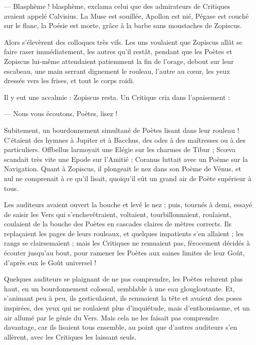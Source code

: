 \documentclass[a4paper, 11pt, oneside, polutonikogreek, french]{article}
\begin{document}
--- Blasphème ! blasphème, exclama celui que des admirateurs de Critiques avaient appelé Calvisius. La Muse est souillée, Apollon est nié, Pégase est couché sur le flanc, la Poésie est morte, grâce à la barbe sans moustaches de Zopiscus.

Alors s'élevèrent des colloques très vifs. Les uns voulaient que Zopiscus allât se faire raser immédiatement, les autres qu'il restât, pendant que les Poètes et Zopiscus lui-même attendaient patiemment la fin de l'orage, debout sur leur escabeau, une main serrant dignement le rouleau, l'autre au cœur, les yeux dressés vers les frises, et tout le corps roidi.

Il y eut une accalmie : Zopiscus resta. Un Critique cria dans l'apaisement :

--- Nous vous écoutons, Poètes, lisez !

Subitement, un bourdonnement simultané de Poètes lisant dans leur rouleau ! C'étaient des hymnes à Jupiter et à Bacchus, des odes à des maîtresses ou à des particuliers. Offbellus larmoyait une Elégie sur les charmes de Tibur ; Scœva scandait très vite une Epode sur l’Amitié ; Coranus luttait avec un Poème sur la Navigation. Quant à Zopiscus, il plongeait le nez dans son Poème de Vénus, et nul ne comprenait à ce qu'il lisait, quoiqu'il eût un grand air de Poète supérieur à tous.

Les auditeurs avaient ouvert la bouche et levé le nez ; puis, tournés à demi, essayé de saisir les Vers qui s'enchevêtraient, voltaient, tourbillonnaient, roulaient, coulaient de la bouche des Poètes en cascades claires de mètres corrects. Ils replaçaient les pages de leurs rouleaux, et quelques impatients s'en allaient ; les rangs se clairsemaient ; mais les Critiques ne remuaient pas, férocement décidés à écouter jusqu'au bout, pour ramener les Poètes aux saines limites de leur Goût, d'après eux le Goût universel !

Quelques auditeurs se plaignant de ne pas comprendre, les Poètes relurent plus haut, en un bourdonnement colossal, semblable à une eau glougloutante. Et, s'animant peu à peu, ils gesticulaient, ils remuaient la tête et avaient des poses inspirées, des yeux qui ne roulaient plus d'inquiétude, mais d'enthousiasme, et un air allumé par le génie du Vers. Mais cela ne les faisait pas comprendre davantage, car ils lisaient tous ensemble, au point que d'autres auditeurs s'en allèrent, avec les Critiques les laissant seuls.
\end{document}

